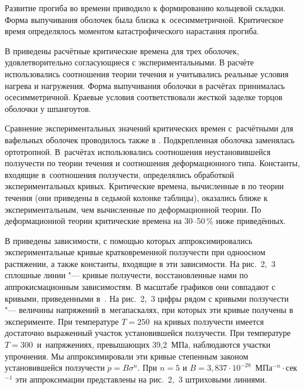 Развитие прогиба во времени приводило к формированию кольцевой складки. 
Форма выпучивания оболочек была близка к~осесимметричной. 
Критическое время определялось моментом катастрофического нарастания прогиба.

В \cite{Kurshin:K1} приведены расчётные критические времена для трех оболочек,
удовлетворительно согласующиеся с экспериментальными. В расчёте \cite{Kurshin:K1}
использовались соотношения теории течения и учитывались реальные условия нагрева и
нагружения. Форма выпучивания оболочки в расчётах принималась осесимметричной. Краевые
условия соответствовали жесткой заделке торцов оболочки у шпангоутов.

Сравнение экспериментальных значений критических времен с~расчётными для вафельных
оболочек проводилось также в \cite{Poshivalov:Posh1}. 
Подкрепленная оболочка заменялась ортотропной. 
В~расчётах использовались соотношения неустановившейся ползучести по теории течения и соотношения деформационного типа. 
Константы, входящие в~соотношения ползучести, определялись обработкой экспериментальных кривых\cite{Ermakov:E1}. 
Критические времена, вычисленные в \cite{Poshivalov:Posh1} по теории течения (они приведены в седьмой
колонке таблицы), оказались ближе к экспериментальным, чем вычисленные по деформационной
теории. 
По деформационной теории критические времена на 30--50\,\% ниже приведённых.




В \cite{Ermakov:E1} приведены зависимости, с помощью которых аппроксимировались
экспериментальные кривые кратковременной ползучести при одноосном растяжении, а также
константы, входящие в эти зависимости. На рис.~2,~3
сплошные линии "--- кривые ползучести, восстановленные нами по аппрокисмационным зависимостям. 
В масштабе графиков они совпадают с кривыми, приведенными в~\cite{Ermakov:E1}. 
На рис.~2,~3 цифры рядом с кривыми ползучести "--- величины напряжений в~мегапаскалях, при которых эти кривые получены в эксперименте. 
При температуре $T = 250$\,\textcelsius{} на кривых ползучести имеется достаточно
выраженный участок установившейся ползучести. 
При температуре $T = 300$\,\textcelsius{} и~напряжениях, превышающих 39,2~МПа, наблюдаются участки упрочнения. 
Мы аппроксимировали эти кривые степенным законом установившейся ползучести $\dot p=B\sigma^n$. 
При $n=5$ и %
$B=3,837\cdot 10^{-28}$~МПа$^{-n}\cdot{}$сек$^{-1}$
эти аппроксимации представлены на
рис.~2,~3 штриховыми линиями.



